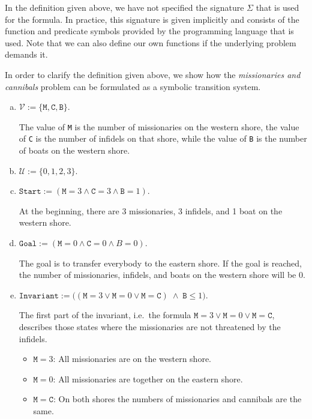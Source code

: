 \remarkEng
In the definition given above, we have not specified the signature $\Sigma$ that is used for the formula.
In practice, this signature is given implicitly and consists of the function and predicate symbols provided by
the programming language that is used.  Note that we can also define our own functions if the underlying
problem demands it.
\eox

\exampleEng
In order to clarify the definition given above, we show how the \emph{missionaries and
  cannibals} problem can be formulated as 
a symbolic transition system.
\begin{enumerate}[(a)]
\item $\mathcal{V} := \{ \mathtt{M}, \mathtt{C}, \mathtt{B} \}$.

      The value of \texttt{M} is the number of missionaries on the western shore, the value of \texttt{C} is
      the number of infidels on that shore, while the value of \texttt{B} is the number of boats on the western
      shore.
\item $\mathcal{U} := \{ 0, 1, 2, 3 \}$.
\item $\texttt{Start} := (\mathtt{M} = 3 \wedge \mathtt{C} = 3 \wedge \mathtt{B} = 1)$.

      At the beginning, there are 3 missionaries, 3 infidels, and 1 boat on the western shore.
\item $\texttt{Goal}  := (\mathtt{M} = 0 \wedge \mathtt{C} = 0 \wedge B = 0)$.

      The goal is to transfer everybody to the eastern shore.  If the goal is reached, the number of
      missionaries, infidels, and boats on the western shore will be $0$.
\item $\texttt{Invariant} := \bigl((\mathtt{M} = 3 \vee \mathtt{M} = 0 \vee \mathtt{M} = \mathtt{C}) \;\wedge\; \mathtt{B} \leq 1\bigr)$.

      The first part of the invariant, i.e.~the formula $\mathtt{M} = 3 \vee \mathtt{M} = 0 \vee \mathtt{M} = \mathtt{C}$,
      describes those states where the missionaries are not threatened by the infidels.
      \begin{itemize}
      \item $\mathtt{M} = 3$: All missionaries are on the western shore.
      \item $\mathtt{M} = 0$: All missionaries are together on the eastern shore.
      \item $\mathtt{M} = \mathtt{C}$: On both shores the numbers of missionaries and cannibals are the same.


\end{itemize}
\end{enumerate}
